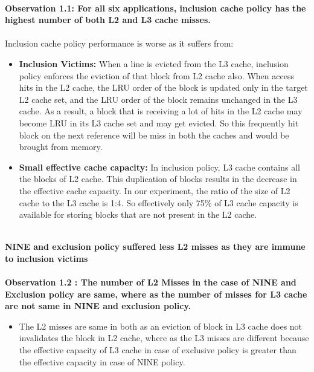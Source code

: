 \documentclass[]{article}
\begin{document}
\\
\textbf{Observation 1.1: For all six applications, inclusion cache policy has the highest number of both L2 and L3 cache misses.} 
\\\\
Inclusion cache policy performance is worse as it suffers from: 
\begin{itemize}
\item \textbf{Inclusion Victims:} When a line is evicted from the L3 cache, inclusion policy enforces the eviction of that block from L2 cache also. When access hits in the L2 cache, the LRU order of the block is updated only in the target L2 cache set, and the LRU order of the block remains unchanged in the L3 cache. As a result, a block that is receiving a lot of hits in the L2 cache may become LRU in its L3 cache set and may get evicted. So this frequently hit block on the next reference will be miss in both the caches and would be brought from memory. 
\item \textbf{Small effective cache capacity:} In inclusion policy, L3 cache contains all the blocks of L2 cache. This duplication of blocks results in the decrease in the effective cache capacity. In our experiment, the ratio of the size of L2 cache to the L3 cache is 1:4. So effectively only 75\% of L3 cache capacity is available for storing blocks that are not present in the L2 cache.
\end{itemize}
\\
\textbf{NINE and exclusion policy suffered less L2 misses as they are immune to inclusion victims}\\
\smallskip
\textbf{\\Observation 1.2 : The number of L2 Misses in the case of NINE and Exclusion policy are same, where as the number of misses for L3 cache are not same in NINE and exclusion policy.} 
\begin{itemize}
    \item The L2 misses are same in both as an eviction of block in L3 cache does not invalidates the block in L2 cache, where as the L3 misses are different because the effective capacity of L3 cache in case of exclusive policy is greater than the effective capacity in case of NINE policy.
\end{itemize}
\pagebreak
\end{document}
